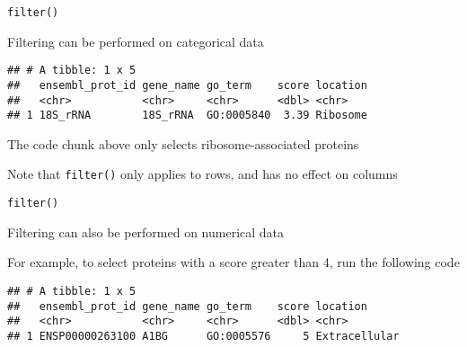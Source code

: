 \documentclass[ignorenonframetext,]{beamer}
\newenvironment{Shaded}{\begin{snugshade}}{\end{snugshade}}
\newcommand{\DecValTok}[1]{\textcolor[rgb]{0.00,0.00,0.81}{#1}}
\newcommand{\KeywordTok}[1]{\textcolor[rgb]{0.13,0.29,0.53}{\textbf{#1}}}
\newcommand{\NormalTok}[1]{#1}
\newcommand{\OperatorTok}[1]{\textcolor[rgb]{0.81,0.36,0.00}{\textbf{#1}}}
\newcommand{\StringTok}[1]{\textcolor[rgb]{0.31,0.60,0.02}{#1}}
\begin{document}
\begin{frame}[fragile]{\texttt{filter()}}
\protect\hypertarget{filter-1}{}

Filtering can be performed on categorical data

\begin{Shaded}
\end{Shaded}

\begin{verbatim}
## # A tibble: 1 x 5
##   ensembl_prot_id gene_name go_term    score location
##   <chr>           <chr>     <chr>      <dbl> <chr>   
## 1 18S_rRNA        18S_rRNA  GO:0005840  3.39 Ribosome
\end{verbatim}

The code chunk above only selects ribosome-associated proteins

Note that \texttt{filter()} only applies to rows, and has no effect on
columns

\end{frame}

\begin{frame}[fragile]{\texttt{filter()}}
\protect\hypertarget{filter-2}{}

Filtering can also be performed on numerical data

For example, to select proteins with a score greater than 4, run the
following code

\begin{Shaded}
\end{Shaded}

\begin{verbatim}
## # A tibble: 1 x 5
##   ensembl_prot_id gene_name go_term    score location     
##   <chr>           <chr>     <chr>      <dbl> <chr>        
## 1 ENSP00000263100 A1BG      GO:0005576     5 Extracellular
\end{verbatim}

\end{frame}
\end{document}
